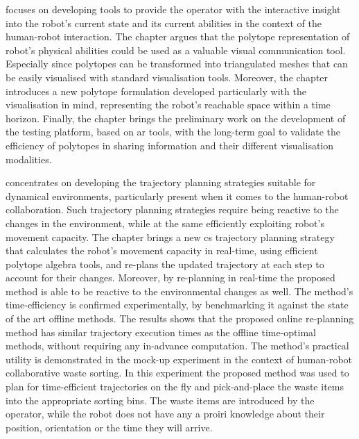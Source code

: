  focuses on developing tools to provide the operator with the interactive insight into the robot's current state and its current abilities in the context of the human-robot interaction.
The chapter argues that the polytope representation of robot's physical abilities could be used as a valuable visual communication tool. Especially since polytopes can be transformed into triangulated meshes that can be easily visualised with standard visualisation tools. Moreover, the chapter introduces a new polytope formulation developed particularly with the visualisation in mind, representing the robot's reachable space within a time horizon. Finally, the chapter brings the preliminary work on the development of the testing platform, based on \gls{ar} tools, with the long-term goal to validate the efficiency of polytopes in sharing information and their different visualisation modalities.

 concentrates on developing the trajectory planning strategies suitable for dynamical environments, particularly present when it comes to the human-robot collaboration. Such trajectory planning strategies require being reactive to the changes in the environment, while at the same efficiently exploiting robot's movement capacity. 
The chapter brings a new \gls{cs} trajectory planning strategy that calculates the robot's movement capacity in real-time, using efficient polytope algebra tools, and re-plans the updated trajectory at each step to account for their changes. Moreover, by re-planning in real-time the proposed method is able to be reactive to the environmental changes as well. The method's time-efficiency is confirmed experimentally, by benchmarking it against the state of the art offline methods. The results shows that the proposed online re-planning method has similar trajectory execution times as the offline time-optimal methods, without requiring any in-advance computation. The method's practical utility is demonstrated in the mock-up experiment in the context of human-robot collaborative waste sorting. In this experiment the proposed method was used to plan for time-efficient trajectories on the fly and pick-and-place the waste items into the appropriate sorting bins. The waste items are introduced by the operator, while the robot does not have any a proiri knowledge about their position, orientation or the time they will arrive. 


